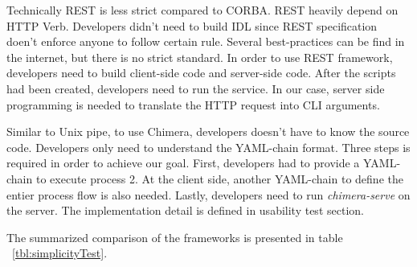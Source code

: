 \documentclass[conference]{IEEEtran}
\begin{document}
Technically REST is less strict compared to CORBA. REST heavily depend on HTTP Verb. Developers didn't need
to build IDL since REST specification doen't enforce anyone to follow certain rule. Several best-practices
can be find in the internet, but there is no strict standard. In order to use REST framework, developers need to
build client-side code and server-side code. After the scripts had been created, developers need to run the service.
In our case, server side programming is needed to translate the HTTP request into CLI arguments.

Similar to Unix pipe, to use Chimera, developers doesn't have to know the source code. Developers only need to
understand the YAML-chain format. Three steps is required in order to achieve our goal. First, developers had to
provide a YAML-chain to execute process 2. At the client side, another YAML-chain to define the entier process flow
is also needed. Lastly, developers need to run {\it chimera-serve} on the server. The implementation detail is
defined in usability test section.

The summarized comparison of the frameworks is presented in table ~\ref{tbl:simplicityTest}.
\end{document}
